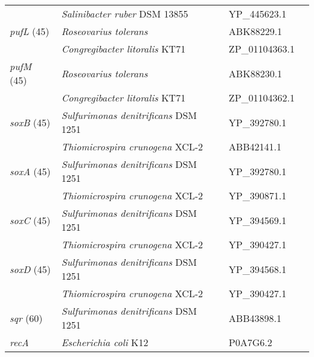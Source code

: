 \begin{table}
\begin{tabularx}{\textwidth}{p{1.6cm}Xp{1.8cm}p{3.5cm}}
 & \emph{Salinibacter ruber} DSM 13855 & YP\_445623.1 & \citet{Balashov2005}\\
\emph{pufL} (45) & \emph{Roseovarius tolerans} & ABK88229.1 & \citet{Labrenz1999}\\
 & \emph{Congregibacter litoralis} KT71 & ZP\_01104363.1 & \citet{Fuchs2007}\\
\emph{pufM} (45) & \emph{Roseovarius tolerans} & ABK88230.1 & \citet{Labrenz1999}\\
 & \emph{Congregibacter litoralis} KT71 & ZP\_01104362.1 & \citet{Fuchs2007}\\
\emph{soxB} (45) & \emph{Sulfurimonas denitrificans} DSM 1251 & YP\_392780.1 & \citet{Sievert2008}\\
 & \emph{Thiomicrospira crunogena} XCL-2 & ABB42141.1 & \citet{Scott2006}\\
\emph{soxA} (45) & \emph{Sulfurimonas denitrificans} DSM 1251 & YP\_392780.1 & \citet{Sievert2008}\\
 & \emph{Thiomicrospira crunogena} XCL-2 & YP\_390871.1 & \citet{Scott2006}\\
\emph{soxC} (45) & \emph{Sulfurimonas denitrificans} DSM 1251 & YP\_394569.1 & \citet{Sievert2008}\\
 & \emph{Thiomicrospira crunogena} XCL-2 & YP\_390427.1 & \citet{Scott2006}\\
\emph{soxD} (45) & \emph{Sulfurimonas denitrificans} DSM 1251 & YP\_394568.1 & \citet{Sievert2008}\\
 & \emph{Thiomicrospira crunogena} XCL-2 & YP\_390427.1 & \citet{Scott2006}\\
\emph{sqr} (60)  & \emph{Sulfurimonas denitrificans} DSM 1251 & ABB43898.1 & \citet{Sievert2008}\\
\emph{recA} & \emph{Escherichia coli} K12 & P0A7G6.2 & \citet{Howard2008}\\
\bottomrule
\end{tabularx}
\end{table}
